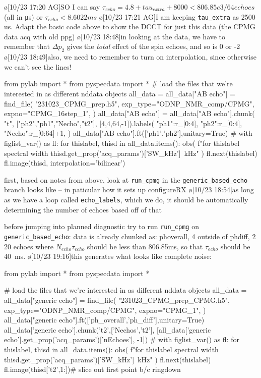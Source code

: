 \o[10/23 17:20 AG]{SO I can say $\tau_{echo} = 4.8 + tau_{extra} + 8000 < 806.85e3/64 echoes$ (all in μs) or $\tau_{echo}<8.6022 ms$}
\o[10/23 17:21 AG]{I am keeping \texttt{tau_extra} as 2500 us.}
Adapt the basic code above to show the DCCT for just this data (the CPMG data acq with old ppg) 
\o[10/23 18:48]{in looking at the data, we have to remember that $\Delta p_2$ gives the \textit{total} effect of the spin echoes, and so is 0 or -2}
\o[10/23 18:49]{also, we need to remember to turn on interpolation, since otherwise we can't see the lines!}
\par
\begin{python}[on]
from pylab import *
from pyspecdata import *
# {{{ load the files that we're interested in as different nddata objects
all_data = {}
all_data["AB echo"] = find_file(
    "231023_CPMG_prep.h5",
    exp_type="ODNP_NMR_comp/CPMG",
    expno="CPMG_16step_1",
)
all_data["AB echo"] = all_data["AB echo"].chunk(
        "t", ["ph2","ph1","Necho","t2"], [4,4,64,-1]).labels(
                {
                    "ph1":r_[0:4],
                    "ph2":r_[0:4],
                    "Necho":r_[0:64]+1,
                    })
all_data["AB echo"].ft(['ph1','ph2'],unitary=True)
# }}}
with figlist_var() as fl:
    for thislabel, thisd in all_data.items():
        obs(
                f"for {thislabel} spectral width {thisd.get_prop('acq_params')['SW_kHz']}~kHz"
                )
        fl.next(thislabel)
        fl.image(thisd, interpolation='bilinear')
\end{python}
\par
first, based on notes from above, look at \texttt{run_cpmg} in the \texttt{generic_based_echo} branch looks like -- in paticular how it sets up configureRX
\o[10/23 18:54]{as long as we have a loop called \texttt{echo_labels}, which we do, it should be automatically determining the number of echoes based off of that}
\begin{err}
    before jumping into planned diagnostic try to run \texttt{run_cpmg} on \texttt{generic_based_echo}:
    data is already chunked as: phoverall, 4 outside of phdiff, 2
    20 echoes where $N_{echo}\tau_{echo}$ should be less than 806.85ms, so that $\tau_{echo}$ should be 40~ms.
    \o[10/23 19:16]{this generates what looks like complete noise:}
\par
\begin{python}[on]
from pylab import *
from pyspecdata import *

# {{{ load the files that we're interested in as different nddata objects
all_data = {}
all_data["generic echo"] = find_file(
    "231023_CPMG_prep_CPMG.h5",
    exp_type="ODNP_NMR_comp/CPMG",
    expno="CPMG_1",
)
all_data["generic echo"].ft(['ph_overall','ph_diff'],unitary=True)
all_data['generic echo'].chunk('t2',['Nechos','t2'],
        [all_data['generic echo'].get_prop('acq_params')['nEchoes'],
            -1])
# }}}
with figlist_var() as fl:
    for thislabel, thisd in all_data.items():
        obs(
                f"for {thislabel} spectral width {thisd.get_prop('acq_params')['SW_kHz']}~kHz"
                )
        fl.next(thislabel)
        fl.image(thisd['t2',1:])# slice out first point b/c ringdown
\end{python}
\par
\end{err}
